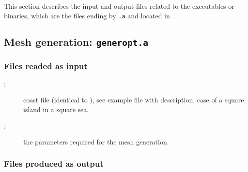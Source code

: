 This section describes the input and output files  related to the executables or binaries, which are the files ending by \texttt{.a} and located in . 


\subsection{Mesh generation: \texttt{generopt.a}}		


\subsubsection{Files readed as input}			
  
\begin{description}
\item[:] coast file (identical to ), see example file with description, case of a square island in a square sea.	\item[:]	the parameters required for the mesh generation.		
\end{description}
				
\subsubsection{Files produced as output}

